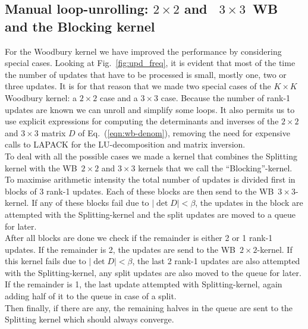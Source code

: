 \documentclass[11pt]{article}
\numberwithin{figure}{section}
\numberwithin{table}{section}
\begin{document}
    \subsection{Manual loop-unrolling: $2\times 2$ and ~$3\times 3$~WB and the Blocking kernel}
      For the Woodbury kernel we have improved the performance by considering special cases. Looking at Fig.~\ref{fig:upd_freq}, it is evident that most of the time the number of updates that have to be processed is small, mostly one, two or three updates. It is for that reason that we made two special cases of the $K\times K$ Woodbury kernel: a $2\times 2$ case and a $3\times 3$ case. Because the number of rank-1 updates are known we can unroll and simplify some loops. It also permits us to use explicit expressions for computing the determinants and inverses of the $2\times 2$ and $3\times 3$ matrix $D$ of Eq.~(\ref{eqn:wb-denom}), removing the need for expensive calls to LAPACK for the LU-decomposition and matrix inversion.\\
    
      To deal with all the possible cases we made a kernel that combines the Splitting kernel with the WB~$2\times 2$ and $3\times 3$ kernels that we call the ``Blocking''-kernel.\\
    
      To maximise arithmetic intensity the total number of updates is divided first in blocks of 3 rank-1 updates. Each of these blocks are then send to the  WB~$3\times 3$-kernel. If any of these blocks fail due to $\left|\det D\right|<\beta$, the updates in the block are attempted with the Splitting-kernel and the split updates are moved to a queue for later.\\
    
      After all blocks are done we check if the remainder is either 2 or 1 rank-1 updates. If the remainder is 2, the updates are send to the WB~$2\times 2$-kernel. If this kernel fails due to $\left|\det D\right|<\beta$, the last 2 rank-1 updates are also attempted with the Splitting-kernel, any split updates are also moved to the queue for later.\\
    
      If the remainder is 1, the last update attempted with Splitting-kernel, again adding half of it to the queue in case of a split.\\
    
      Then finally, if there are any, the remaining halves in the queue are sent to the Splitting kernel which should always converge.\\
    
\end{document}
